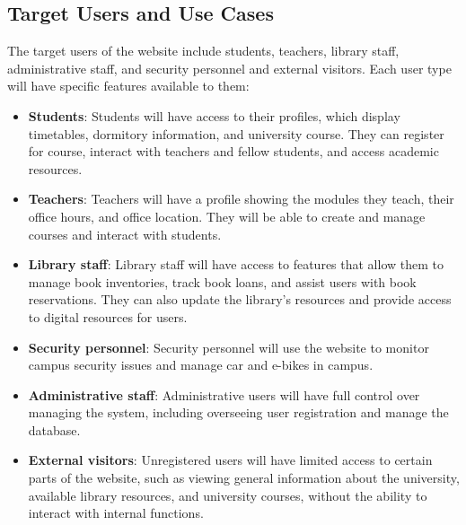 \documentclass[12pt]{article}
\begin{document}
\subsection{Target Users and Use Cases}
The target users of the website include students, teachers, library staff, administrative staff, and security personnel and external visitors.
Each user type will have specific features available to them:
\begin{itemize}
    \item \textbf{Students}: Students will have access to their profiles, which display timetables, dormitory information, 
    and university course. They can register for course, interact with teachers and fellow students, and access academic resources.
    \item \textbf{Teachers}: Teachers will have a profile showing the modules they teach, their office hours, and office location. 
    They will be able to create and manage courses and interact with students.
    \item \textbf{Library staff}: Library staff will have access to features that allow them to manage book inventories, track book 
    loans, and assist users with book reservations. They can also update the library's resources and provide access to digital resources for users.
    \item \textbf{Security personnel}: Security personnel will use the website to monitor campus security issues
    and manage car and e-bikes in campus.
    \item \textbf{Administrative staff}: Administrative users will have full control over managing the system, including overseeing
     user registration and manage the database.
    \item \textbf{External visitors}: Unregistered users will have limited access to certain parts of the website, such as viewing 
    general information about the university, available library resources, and university courses, without the ability to interact with 
    internal functions.
\end{itemize}
\end{document}
